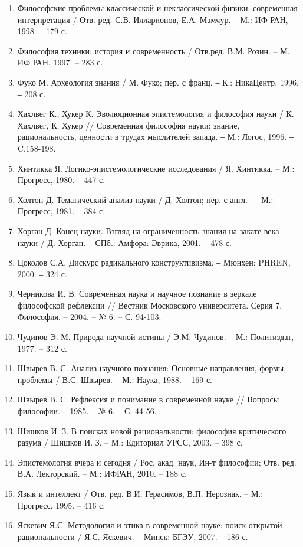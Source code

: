 \begin{enumerate}
\item Философские проблемы классической и неклассической физики:
современная интерпретация / Отв. ред. С.В. Илларионов, Е.А. Мамчур. – М.:
ИФ РАН, 1998. – 179 с.

\item Философия техники: история и современность / Отв.ред. В.М.
Розин. – М.: ИФ РАН, 1997. – 283 с.

\item Фуко М. Археология знания / М. Фуко; пер. с франц. ‒ К.: НикаЦентр, 1996. ‒ 208 с.

\item Хахлвег К., Хукер К. Эволюционная эпистемология и философия
науки / К. Хахлвег, К. Хукер // Современная философия науки: знание,
рациональность, ценности в трудах мыслителей запада. ‒ М.: Логос, 1996. ‒
C.158-198.

\item Хинтикка Я. Логико-эпистемологические исследования / Я.
Хинтикка. – М.: Прогресс, 1980. – 447 с.

\item Холтон Д. Тематический анализ науки / Д. Холтон; пер. с англ. ---
М.: Прогресс, 1981. – 384 с.

\item Хорган Д. Конец науки. Взгляд на ограниченность знания на закате
века науки / Д. Хорган. – СПб.: Амфора: Эврика, 2001. ‒ 478 с.

\item Цоколов С.А. Дискурс радикального конструктивизма. ‒ Мюнхен:
PHREN, 2000. ‒ 324 с.

\item Черникова И. В. Современная наука и научное познание в зеркале
философской рефлексии // Вестник Московского университета. Серия 7.
Философия. – 2004. – № 6. – С. 94-103.

\item Чудинов Э. М. Природа научной истины / Э.М. Чудинов. – М.:
Политиздат, 1977. – 312 с.

\item Швырев В. С. Анализ научного познания: Основные направления,
формы, проблемы / В.С. Швырев. – М.: Наука, 1988. – 169 с.

\item Швырев В. С. Рефлексия и понимание в современной науке //
Вопросы философии. – 1985. – № 6. – С. 44-56.

\item Шишков И. З. В поисках новой рациональности: философия
критического разума / Шишков И. З. – М.: Едиториал УРСС, 2003. – 398 с.

\item Эпистемология вчера и сегодня / Рос. акад. наук, Ин-т философии;
Отв. ред. В.А. Лекторский. – М.: ИФРАН, 2010. – 188 с.

\item Язык и интеллект / Отв. ред. В.И. Герасимов, В.П. Нерознак. – М.:
Прогресс, 1995. – 416 с.

\item Яскевич Я.С. Методология и этика в современной науке: поиск
открытой рациональности / Я.С. Яскевич. – Минск: БГЭУ, 2007. – 186 с.
\end{enumerate}



